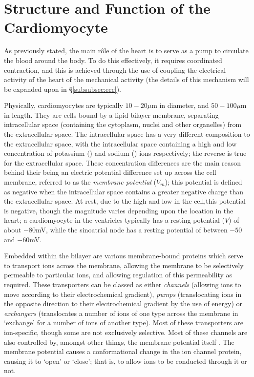 \documentclass[../thesis-main.tex]{subfiles}
\begin{document}
\section{Structure and Function of the Cardiomyocyte}
\label{sec:cardiomyocyte}
As previously stated, the main r\^ole of the heart is to serve as a pump to circulate the blood around the body. To do this effectively, it requires coordinated contraction, and this is achieved through the use of coupling the electrical activity of the heart of the mechanical activity (the details of this mechanism will be expanded upon in \S\ref{subsubsec:ecc}).

Physically, cardiomyocytes are typically $10-20\mu$m in diameter, and $50-100\mu$m in length. They are cells bound by a lipid bilayer membrane, separating intracellular space (containing the cytoplasm, nuclei and other organelles) from the extracellular space. The intracellular space has a very different composition to the extracellular space, with the intracellular space containing a high and low concentration of potassium (\K) and sodium (\na) ions respectively; the reverse is true for the extracellular space. These concentration differences are the main reason behind their being an electric potential difference set up across the cell membrane, referred to as the \emph{membrane potential} ($V_m$); this potential is defined as negative when the intracellular space contains a greater negative charge than the extracellular space. At rest, due to the high \K{} and low \na{} in the cell,this potential is negative, though the magnitude varies depending upon the location in the heart; a cardiomyocyte in the ventricles typically has a resting potential ($V$) of about $-80$mV, while the sinoatrial node has a resting potential of between $-50$ and $-60$mV.

Embedded within the bilayer are various membrane-bound proteins which serve to transport ions across the membrane, allowing the membrane to be selectively permeable to particular ions, and allowing regulation of this permeability as required. These transporters can be classed as either \emph{channels} (allowing ions to move according to their electrochemical gradient), \emph{pumps} (translocating ions in the opposite direction to their electrochemical gradient by the use of energy) or \emph{exchangers} (translocates a number of ions of one type across the membrane in `exchange' for a number of ions of another type). Most of these transporters are ion-specific, though some are not exclusively selective. Most of these channels are also controlled by, amongst other things, the membrane potential itself \citep{Bezanilla2000}. The membrane potential causes a conformational change in the ion channel protein, causing it to `open' or `close'; that is, to allow ions to be conducted through it or not.
\end{document}
